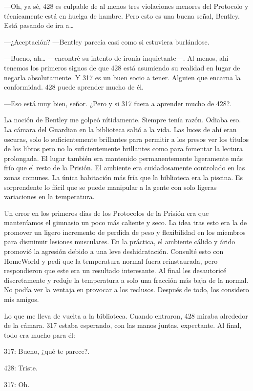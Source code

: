 ---Oh, ya sé, 428 es culpable de al menos tres violaciones menores del
Protocolo y técnicamente está en huelga de hambre. Pero esto es una
buena señal, Bentley. Está pasando de ira a\ldots{}

---¿Aceptación? ---Bentley parecía casi como si estuviera burlándose.

---Bueno, ah\ldots{} ---encontré su intento de ironía inquietante---. Al
menos, ahí tenemos los primeros signos de que 428 está asumiendo su
realidad en lugar de negarla absolutamente. Y 317 es un buen socio a
tener. Alguien que encarna la conformidad. 428 puede aprender mucho de
él.

---Eso está muy bien, señor. ¿Pero y si 317 fuera a aprender mucho de
428?.

La noción de Bentley me golpeó nítidamente. Siempre tenía razón. Odiaba
eso. La cámara del Guardian en la biblioteca saltó a la vida. Las luces
de ahí eran oscuras, solo lo suficientemente brillantes para permitir a
los presos ver los títulos de los libros pero no lo suficientemente
brillantes como para fomentar la lectura prolongada. El lugar también
era mantenido permanentemente ligeramente más frío que el resto de la
Prisión. El ambiente era cuidadosamente controlado en las zonas comunes.
La única habitación más fría que la biblioteca era la piscina. Es
sorprendente lo fácil que se puede manipular a la gente con solo ligeras
variaciones en la temperatura.

Un error en los primeros días de los Protocolos de la Prisión era que
manteníamos el gimnasio un poco más caliente y seco. La idea tras esto
era la de promover un ligero incremento de perdida de peso y
flexibilidad en los miembros para disminuir lesiones musculares. En la
práctica, el ambiente cálido y árido promovió la agresión debido a una
leve deshidratación. Consulté esto con HomeWorld y pedí que la
temperatura normal fuera reinstaurada, pero respondieron que este era un
resultado interesante. Al final les desautoricé discretamente y reduje
la temperatura a solo una fracción más baja de la normal. No podía ver
la ventaja en provocar a los reclusos. Después de todo, los considero
mis amigos.

Lo que me lleva de vuelta a la biblioteca. Cuando entraron, 428 miraba
alrededor de la cámara. 317 estaba esperando, con las manos juntas,
expectante. Al final, todo era mucho para él:

317: Bueno, ¿qué te parece?.

428: Triste.

317: Oh.

